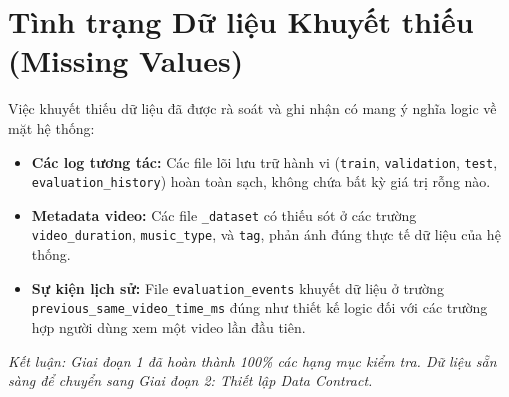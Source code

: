 \documentclass[12pt,a4paper]{article}
\begin{document}
\section{Tình trạng Dữ liệu Khuyết thiếu (Missing Values)}
Việc khuyết thiếu dữ liệu đã được rà soát và ghi nhận có mang ý nghĩa logic về mặt hệ thống:
\begin{itemize}
    \item \textbf{Các log tương tác:} Các file lõi lưu trữ hành vi (\texttt{train}, \texttt{validation}, \texttt{test}, \texttt{evaluation\_history}) hoàn toàn sạch, không chứa bất kỳ giá trị rỗng nào.
    \item \textbf{Metadata video:} Các file \texttt{\_dataset} có thiếu sót ở các trường \texttt{video\_duration}, \texttt{music\_type}, và \texttt{tag}, phản ánh đúng thực tế dữ liệu của hệ thống. 
    \item \textbf{Sự kiện lịch sử:} File \texttt{evaluation\_events} khuyết dữ liệu ở trường \texttt{previous\_same\_video\_time\_ms} đúng như thiết kế logic đối với các trường hợp người dùng xem một video lần đầu tiên.
\end{itemize}

\vspace{20pt}
\noindent\textit{Kết luận: Giai đoạn 1 đã hoàn thành 100\% các hạng mục kiểm tra. Dữ liệu sẵn sàng để chuyển sang Giai đoạn 2: Thiết lập Data Contract.}
\end{document}
